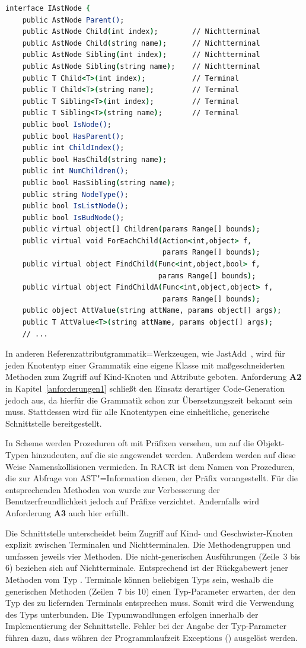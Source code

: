 \begin{lstlisting}[language=csh, caption={Schnittstelle der Klasse \csh{Racr.AstNode}}, label=csh:astnode]
interface IAstNode {
	public AstNode Parent();
	public AstNode Child(int index);		// Nichtterminal
	public AstNode Child(string name);		// Nichtterminal
	public AstNode Sibling(int index);		// Nichtterminal
	public AstNode Sibling(string name);	// Nichtterminal
	public T Child<T>(int index);			// Terminal
	public T Child<T>(string name);			// Terminal
	public T Sibling<T>(int index);			// Terminal
	public T Sibling<T>(string name);		// Terminal
	public bool IsNode();
	public bool HasParent();
	public int ChildIndex();
	public bool HasChild(string name);
	public int NumChildren();
	public bool HasSibling(string name);
	public string NodeType();
	public bool IsListNode();
	public bool IsBudNode();
	public virtual object[] Children(params Range[] bounds);
	public virtual void ForEachChild(Action<int,object> f,
									 params Range[] bounds);
	public virtual object FindChild(Func<int,object,bool> f,
									params Range[] bounds);
	public virtual object FindChildA(Func<int,object,object> f,
									 params Range[] bounds);
	public object AttValue(string attName, params object[] args);
	public T AttValue<T>(string attName, params object[] args);
	// ...
\end{lstlisting}

In anderen Referenzattributgrammatik=Werkzeugen, wie JastAdd~\cite{Ekman2007}, wird für jeden Knotentyp einer Grammatik eine eigene Klasse mit maßgeschneiderten Methoden zum Zugriff auf Kind-Knoten und Attribute geboten. Anforderung \textbf{A2} in Kapitel~\ref{anforderungen1} schließt den Einsatz derartiger Code-Generation jedoch aus, da hierfür die Grammatik schon zur Übersetzungszeit bekannt sein muss. Stattdessen wird für alle Knotentypen eine einheitliche, generische Schnittstelle bereitgestellt.

In Scheme werden Prozeduren oft mit Präfixen versehen, um auf die Objekt-Typen hinzudeuten, auf die sie angewendet werden. Außerdem werden auf diese Weise Namenskollisionen vermieden. In RACR ist dem Namen von Prozeduren, die zur Abfrage von AST"=Information dienen, der Präfix  vorangestellt. Für die entsprechenden Methoden von  wurde zur Verbesserung der Benutzerfreundlichkeit jedoch auf Präfixe verzichtet. Andernfalls wird Anforderung \textbf{A3} auch hier erfüllt.

Die Schnittstelle unterscheidet beim Zugriff auf Kind- und Geschwister-Knoten explizit zwischen Terminalen und Nichtterminalen. Die Methodengruppen  und  umfassen jeweils vier Methoden. Die nicht-generischen Ausführungen (Zeile~3 bis 6) beziehen sich auf Nichtterminale. Entsprechend ist der Rückgabewert jener Methoden vom Typ . Terminale können beliebigen Typs sein, weshalb die generischen Methoden (Zeilen~7 bis 10) einen Typ-Parameter erwarten, der den Typ des zu liefernden Terminals entsprechen muss. Somit wird die Verwendung des Typs  unterbunden. Die Typumwandlungen erfolgen innerhalb der Implementierung der Schnittstelle. Fehler bei der Angabe der Typ-Parameter führen dazu, dass währen der Programmlaufzeit Exceptions () ausgelöst werden.

